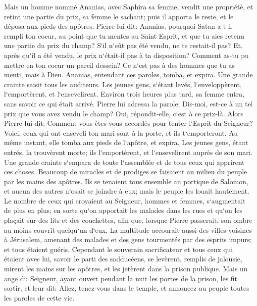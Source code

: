 \verse Mais un homme nommé Ananias, avec Saphira sa femme, vendit une propriété, 
\verse et retint une partie du prix, sa femme le sachant; puis il apporta le reste, et le déposa aux pieds des apôtres. 
\verse Pierre lui dit: Ananias, pourquoi Satan a-t-il rempli ton coeur, au point que tu mentes au Saint Esprit, et que tu aies retenu une partie du prix du champ? 
\verse S`il n`eût pas été vendu, ne te restait-il pas? Et, après qu`il a été vendu, le prix n`était-il pas à ta disposition? Comment as-tu pu mettre en ton coeur un pareil dessein? Ce n`est pas à des hommes que tu as menti, mais à Dieu. 
\verse Ananias, entendant ces paroles, tomba, et expira. Une grande crainte saisit tous les auditeurs. 
\verse Les jeunes gens, s`étant levés, l`enveloppèrent, l`emportèrent, et l`ensevelirent. 
\verse Environ trois heures plus tard, sa femme entra, sans savoir ce qui était arrivé. 
\verse Pierre lui adressa la parole: Dis-moi, est-ce à un tel prix que vous avez vendu le champ? Oui, répondit-elle, c`est à ce prix-là. 
\verse Alors Pierre lui dit: Comment vous êtes-vous accordés pour tenter l`Esprit du Seigneur? Voici, ceux qui ont enseveli ton mari sont à la porte, et ils t`emporteront. 
\verse Au même instant, elle tomba aux pieds de l`apôtre, et expira. Les jeunes gens, étant entrés, la trouvèrent morte; ils l`emportèrent, et l`ensevelirent auprès de son mari. 
\verse Une grande crainte s`empara de toute l`assemblée et de tous ceux qui apprirent ces choses. 
\verse Beaucoup de miracles et de prodiges se faisaient au milieu du peuple par les mains des apôtres. Ils se tenaient tous ensemble au portique de Salomon, 
\verse et aucun des autres n`osait se joindre à eux; mais le peuple les louait hautement. 
\verse Le nombre de ceux qui croyaient au Seigneur, hommes et femmes, s`augmentait de plus en plus; 
\verse en sorte qu`on apportait les malades dans les rues et qu`on les plaçait sur des lits et des couchettes, afin que, lorsque Pierre passerait, son ombre au moins couvrît quelqu`un d`eux. 
\verse La multitude accourait aussi des villes voisines à Jérusalem, amenant des malades et des gens tourmentés par des esprits impurs; et tous étaient guéris. 
\verse Cependant le souverain sacrificateur et tous ceux qui étaient avec lui, savoir le parti des sadducéens, se levèrent, remplis de jalousie, 
\verse mirent les mains sur les apôtres, et les jetèrent dans la prison publique. 
\verse Mais un ange du Seigneur, ayant ouvert pendant la nuit les portes de la prison, les fit sortir, et leur dit: 
\verse Allez, tenez-vous dans le temple, et annoncez au peuple toutes les paroles de cette vie. 

